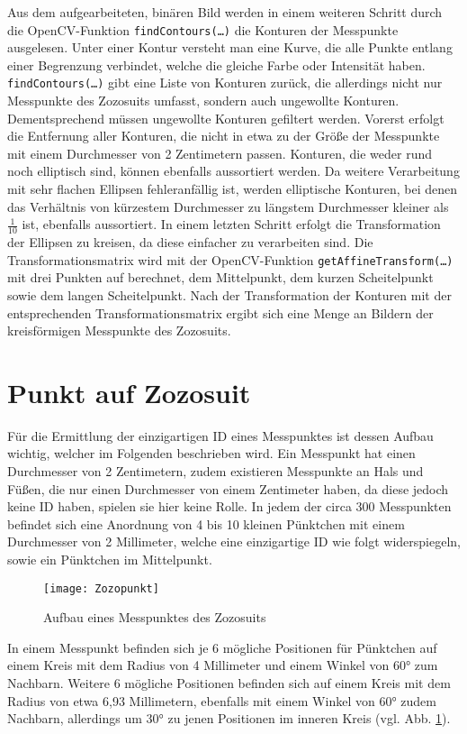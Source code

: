 Aus dem aufgearbeiteten, binären Bild werden in einem weiteren Schritt durch die OpenCV-Funktion \texttt{findContours(\dots)} die Konturen
der Messpunkte ausgelesen. Unter einer Kontur versteht man eine Kurve, die alle Punkte entlang einer Begrenzung verbindet, welche die gleiche 
Farbe oder Intensität haben. \texttt{findContours(\dots)} gibt eine Liste von Konturen zurück, die allerdings nicht nur Messpunkte des Zozosuits
umfasst, sondern auch ungewollte Konturen. Dementsprechend müssen ungewollte Konturen gefiltert werden. Vorerst erfolgt die Entfernung
aller Konturen, die nicht in etwa zu der Größe der Messpunkte mit einem Durchmesser von 2 Zentimetern passen. Konturen, die weder rund noch elliptisch sind,
können ebenfalls aussortiert werden. Da weitere Verarbeitung mit sehr flachen Ellipsen fehleranfällig ist, werden elliptische Konturen,
bei denen das Verhältnis von kürzestem Durchmesser zu längstem Durchmesser kleiner als $\frac{1}{10}$ ist, ebenfalls aussortiert. In einem
letzten Schritt erfolgt die Transformation der Ellipsen zu kreisen, da diese einfacher zu verarbeiten sind. Die Transformationsmatrix wird
mit der OpenCV-Funktion \texttt{getAffineTransform(\dots)} mit drei Punkten auf berechnet, dem Mittelpunkt, dem kurzen Scheitelpunkt sowie dem langen
Scheitelpunkt. Nach der Transformation der Konturen mit der entsprechenden Transformationsmatrix ergibt sich eine Menge an Bildern der kreisförmigen Messpunkte 
des Zozosuits.

\section{Punkt auf Zozosuit}

Für die Ermittlung der einzigartigen ID eines Messpunktes ist dessen Aufbau wichtig, welcher im Folgenden beschrieben wird.
Ein Messpunkt hat einen Durchmesser von 2 Zentimetern, zudem existieren Messpunkte an Hals und Füßen, die nur einen Durchmesser
von einem Zentimeter haben, da diese jedoch keine ID haben, spielen sie hier keine Rolle. In jedem der circa 300 Messpunkten befindet
sich eine Anordnung von 4 bis 10 kleinen Pünktchen mit einem Durchmesser von 2 Millimeter, welche eine einzigartige ID wie folgt widerspiegeln, sowie ein
Pünktchen im Mittelpunkt.
\begin{figure}[t]
    \centering
    \texttt{[image: Zozopunkt]}
    \label{fig:zozopunnkt}
    \caption{Aufbau eines Messpunktes des Zozosuits \cite{Pina:2018}}
\end{figure}
In einem Messpunkt befinden sich je 6 mögliche Positionen für Pünktchen auf einem Kreis mit dem Radius von 4 Millimeter und einem Winkel von 60° zum 
Nachbarn. Weitere 6 mögliche Positionen befinden sich auf einem Kreis mit dem Radius von etwa 6,93 Millimetern, ebenfalls mit einem Winkel von 60° zudem
Nachbarn, allerdings um 30° zu jenen Positionen im inneren Kreis (vgl. Abb. \ref{fig:zozopunnkt}).

